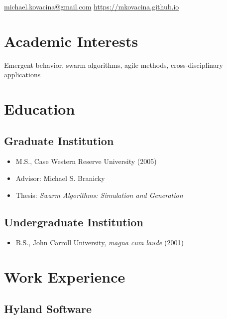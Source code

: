 \documentclass{cv_style}
\begin{document}

    \begin{center}  

    \contact
		{\href{mailto:michael.kovacina@gmail.com}{michael.kovacina@gmail.com}}
		{\href{https://mkovacina.github.io}{https://mkovacina.github.io}}

	\end{center}
	
	\section{Academic Interests}
	Emergent behavior, swarm algorithms, agile methods, cross-disciplinary applications

	\section{Education}
		\subsection{Graduate Institution}
				\begin{itemize}
					\item M.S., Case Western Reserve University (2005)
					\item Advisor: Michael S. Branicky
					\item Thesis: {\em Swarm Algorithms: Simulation and Generation}
				\end{itemize}
				
		\subsection{Undergraduate Institution}
				\begin{itemize}
					\item B.S., John Carroll University, \textit{magna cum laude} (2001)
				\end{itemize}
		
	\section{Work Experience}
		\subsection{Hyland Software}
\end{document}
